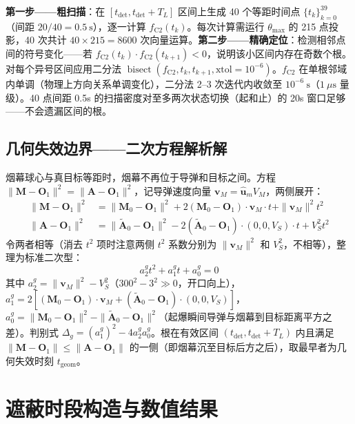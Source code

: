 \documentclass[12pt,a4paper]{ctexart}
\newcommand{\tdet}{t_{\text{det}}}
\begin{document}
\textbf{第一步——粗扫描}：在 $[\tdet, \tdet + T_L]$ 区间上生成 40 个等距时间点 $\{t_k\}_{k=0}^{39}$（间距 $20/40 = 0.5\ \mathrm{s}$），逐一计算 $f_{\text{C2}}(t_k)$。每次计算需运行 $\theta_{\max}$ 的 215 点投影，40 次共计 $40 \times 215 = 8600$ 次向量运算。\textbf{第二步——精确定位}：检测相邻点间的符号变化——若 $f_{\text{C2}}(t_k) \cdot f_{\text{C2}}(t_{k+1}) < 0$，说明该小区间内存在奇数个根。对每个异号区间应用二分法 $\operatorname{bisect}(f_{\text{C2}}, t_k, t_{k+1}, \text{xtol}=10^{-6})$。$f_{\text{C2}}$ 在单根邻域内单调（物理上方向关系单调变化），二分法 2--3 次迭代内收敛至 $10^{-6}\ \mathrm{s}$（$1\ \mu\mathrm{s}$ 量级）。40 点间距 0.5s 的扫描密度对至多两次状态切换（起和止）的 20s 窗口足够——不会遗漏区间的根。

\subsection{几何失效边界——二次方程解析解}

烟幕球心与真目标等距时，烟幕不再位于导弹和目标之间。方程 $\|\mathbf{M} - \mathbf{O}_1\|^2 = \|\mathbf{A} - \mathbf{O}_1\|^2$，记导弹速度向量 $\mathbf{v}_M = \hat{\mathbf{u}}_m V_M$，两侧展开：
\begin{align}
\|\mathbf{M} - \mathbf{O}_1\|^2 &= \|\mathbf{M}_0 - \mathbf{O}_1\|^2 + 2(\mathbf{M}_0 - \mathbf{O}_1)\!\cdot\!\mathbf{v}_M \cdot t + \|\mathbf{v}_M\|^2 t^2 \\
\|\mathbf{A} - \mathbf{O}_1\|^2 &= \|\tilde{\mathbf{A}}_0 - \mathbf{O}_1\|^2 - 2(\tilde{\mathbf{A}}_0 - \mathbf{O}_1)\!\cdot\!(0,0,V_S) \cdot t + V_S^2 t^2
\end{align}
令两者相等（消去 $t^2$ 项时注意两侧 $t^2$ 系数分别为 $\|\mathbf{v}_M\|^2$ 和 $V_S^2$，不相等），整理为标准二次型：
\begin{equation}
\boxed{a_2^g t^2 + a_1^g t + a_0^g = 0}
\end{equation}
其中 $a_2^g = \|\mathbf{v}_M\|^2 - V_S^2$（$300^2 - 3^2 \gg 0$，开口向上），$a_1^g = 2[(\mathbf{M}_0 - \mathbf{O}_1)\cdot\mathbf{v}_M + (\tilde{\mathbf{A}}_0 - \mathbf{O}_1)\cdot(0,0,V_S)]$，$a_0^g = \|\mathbf{M}_0 - \mathbf{O}_1\|^2 - \|\tilde{\mathbf{A}}_0 - \mathbf{O}_1\|^2$（起爆瞬间导弹与烟幕到目标距离平方之差）。判别式 $\Delta_g = (a_1^g)^2 - 4a_2^g a_0^g$。根在有效区间 $(\tdet, \tdet+T_L)$ 内且满足 $\|\mathbf{M} - \mathbf{O}_1\| \leq \|\mathbf{A} - \mathbf{O}_1\|$ 的一侧（即烟幕沉至目标后方之后），取最早者为几何失效时刻 $t_{\text{geom}}$。

\section{遮蔽时段构造与数值结果}
\end{document}
